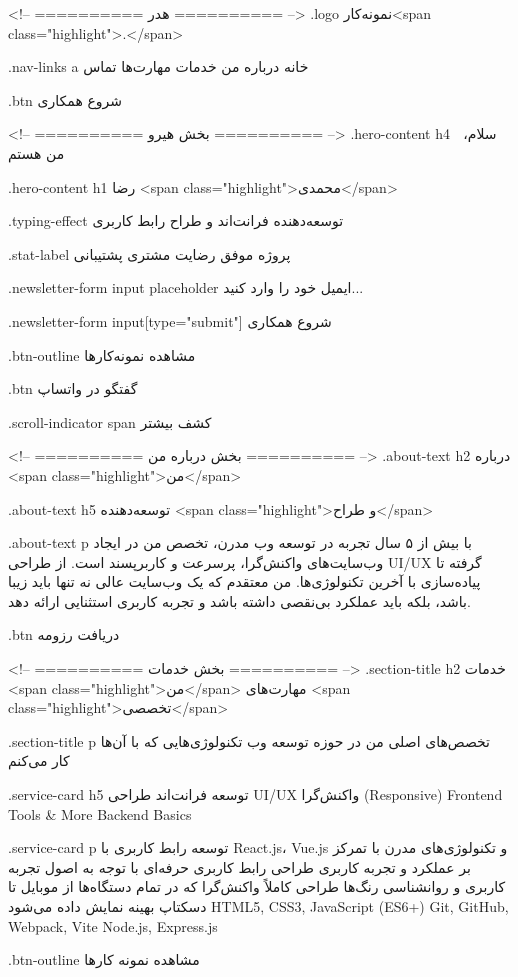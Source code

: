 <!-- ========== هدر ========== -->
.logo
نمونه‌کار<span class="highlight">.</span>

.nav-links a
خانه
درباره من
خدمات
مهارت‌ها
تماس

.btn
شروع همکاری

<!-- ========== بخش هیرو ========== -->
.hero-content h4
👋 سلام، من هستم

.hero-content h1
رضا <span class="highlight">محمدی</span>

.typing-effect
توسعه‌دهنده فرانت‌اند و طراح رابط کاربری

.stat-label
پروژه موفق
رضایت مشتری
پشتیبانی

.newsletter-form input placeholder
ایمیل خود را وارد کنید...

.newsletter-form input[type="submit"]
شروع همکاری

.btn-outline
مشاهده نمونه‌کارها

.btn
گفتگو در واتساپ

.scroll-indicator span
کشف بیشتر

<!-- ========== بخش درباره من ========== -->
.about-text h2
درباره <span class="highlight">من</span>

.about-text h5
توسعه‌دهنده <span class="highlight">و طراح</span>

.about-text p
با بیش از ۵ سال تجربه در توسعه وب مدرن، تخصص من در ایجاد وب‌سایت‌های واکنش‌گرا، پرسرعت و کاربرپسند است. از طراحی UI/UX گرفته تا پیاده‌سازی با آخرین تکنولوژی‌ها.
من معتقدم که یک وب‌سایت عالی نه تنها باید زیبا باشد، بلکه باید عملکرد بی‌نقصی داشته باشد و تجربه کاربری استثنایی ارائه دهد.

.btn
دریافت رزومه

<!-- ========== بخش خدمات ========== -->
.section-title h2
خدمات <span class="highlight">من</span>
مهارت‌های <span class="highlight">تخصصی</span>

.section-title p
تخصص‌های اصلی من در حوزه توسعه وب
تکنولوژی‌هایی که با آن‌ها کار می‌کنم

.service-card h5
توسعه فرانت‌اند
طراحی UI/UX
واکنش‌گرا (Responsive)
Frontend
Tools & More
Backend Basics

.service-card p
توسعه رابط کاربری با React.js، Vue.js و تکنولوژی‌های مدرن با تمرکز بر عملکرد و تجربه کاربری
طراحی رابط کاربری حرفه‌ای با توجه به اصول تجربه کاربری و روانشناسی رنگ‌ها
طراحی کاملاً واکنش‌گرا که در تمام دستگاه‌ها از موبایل تا دسکتاپ بهینه نمایش داده می‌شود
HTML5, CSS3, JavaScript (ES6+)
Git, GitHub, Webpack, Vite
Node.js, Express.js

.btn-outline
مشاهده نمونه کارها

